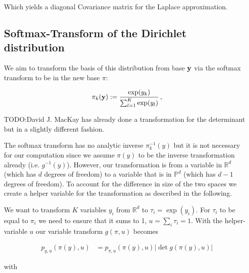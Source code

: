 Which yields a diagonal Covariance matrix for the Laplace approximation.

\subsection{Softmax-Transform of the Dirichlet distribution}

We aim to transform the basis of this distribution from base $\mathbf{y}$ via the softmax transform to be in the new base $\pi$:

\begin{equation}\label{eq:softmax}
\pi_k(\mathbf{y}) := \frac{\exp(y_k)}{\sum_{l=1}^K \exp(y_l)} \, ,
\end{equation}


TODO:David J. MacKay has already done a transformation for the determinant but in a slightly different fashion. 

The softmax transform has no analytic inverse $\pi_k^{-1}(y)$ but it is not necessary for our computation since we assume $\pi(y)$ to be the inverse transformation already (i.e. $g^{-1}(y)$). However, our transformation is from a variable in $\mathbb{R}^d$ (which has $d$ degrees of freedom) to a variable that is in $\mathbb{P}^d$ (which has $d-1$ degrees of freedom). To account for the difference in size of the two spaces we create a helper variable for the transformation as described in the following.

We want to transform $K$ variables $y_i$ from $\mathbb{R}^d$ to $\tau_i = \exp(y_i)$. For $\tau_i$ to be equal to $\pi_i$ we need to ensure that it sums to 1, $u = \sum_i \tau_i = 1$. With the helper-variable $u$ our variable transform $g(\pi, u)$ becomes

\begin{align}
	p_{y,u}(\pi(y), u) &= p_{\pi, u}(\pi(y), u) |\det g(\pi(y), u)|
\end{align}

with 

